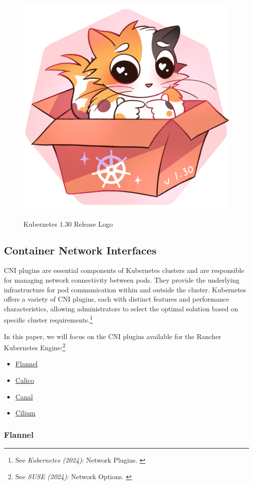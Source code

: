 \begin{figure}[H]
\centering
\caption {Kubernetes 1.30 Release Logo}
\includegraphics[width=0.3\linewidth]{images/k8s-1.30.png}
\label{fig:uwubernetes}
\end{figure}

\subsection{Container Network Interfaces}

CNI plugins are essential components of Kubernetes clusters and are responsible for managing network connectivity between pods. They provide the underlying infrastructure for pod communication within and outside the cluster. Kubernetes offers a variety of CNI plugins, each with distinct features and performance characteristics, allowing administrators to select the optimal solution based on specific cluster requirements.\footnote{See \textit{Kubernetes (2024)}: Network Plugins. \cite{networkPlugin}}

In this paper, we will focus on the CNI plugins available for the Rancher Kubernetes Engine:\footnote{See \textit{SUSE (2024)}: Network Options. \cite{networkOptions}}

\begin{itemize}
    \item \href{https://github.com/flannel-io/flannel}{Flannel}
    \item \href{https://www.tigera.io/project-calico/}{Calico}
    \item \href{https://docs.tigera.io/calico/latest/getting-started/kubernetes/flannel/install-for-flannel#installing-calico-for-policy-and-flannel-aka-canal-for-networking}{Canal}
    \item \href{https://github.com/cilium/cilium}{Cilium}
\end{itemize}

\subsubsection{Flannel}

